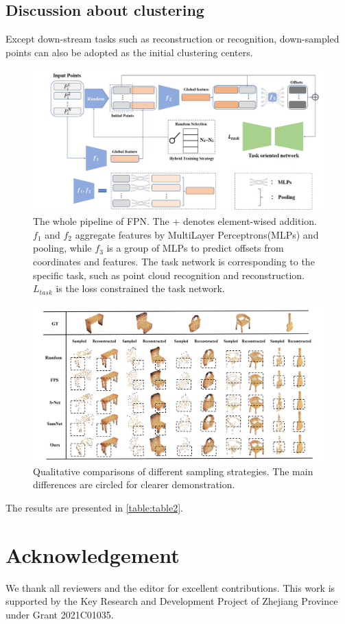 \documentclass[a4paper,10pt]{article}
\begin{document}
\begin{multicols}{2}
\subsection{Discussion about clustering}
Except down-stream tasks such as reconstruction or recognition, down-sampled points can also be adopted as the initial clustering centers.
\begin{figure}
\centering
 \includegraphics[width=\linewidth]{images/fig2.png}
 \caption{The whole pipeline of FPN. The + denotes element-wised addition. $f_1$ and $f_2$ aggregate features by MultiLayer Perceptrons(MLPs) and pooling, while $f_3$ is a group of MLPs to predict offsets from coordinates and features. The task network is corresponding to the speciﬁc task, such as point cloud recognition and reconstruction. $L_{task}$ is the loss constrained the task network.}
\label{fig:fig2}
\end{figure}

\begin{figure}
\centering
 \includegraphics[width=\linewidth]{images/fig3.png}
 \caption{Qualitative comparisons of different sampling strategies. The main differences are circled for clearer demonstration.}
\label{fig:fig3}
\end{figure}

The results are presented in \ref{table:table2}.

\section*{Acknowledgement}
We thank all reviewers and the editor for excellent contributions. This work is supported by the Key Research and Development Project of Zhejiang Province under Grant 2021C01035.

\printbibliography
\end{multicols}
\end{document}
